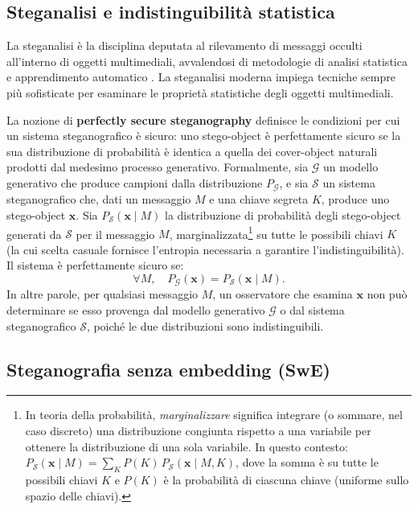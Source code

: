 \subsection{Steganalisi e indistinguibilità statistica}

La steganalisi è la disciplina deputata al rilevamento di messaggi occulti all'interno di oggetti multimediali, avvalendosi di metodologie di analisi statistica e apprendimento automatico \cite{apau-2024}. La steganalisi moderna impiega tecniche sempre più sofisticate per esaminare le proprietà statistiche degli oggetti multimediali.

La nozione di \textbf{perfectly secure steganography} \cite{kaptchuk-2021} definisce le condizioni per cui un sistema steganografico è sicuro: uno stego-object è perfettamente sicuro se la sua distribuzione di probabilità è identica a quella dei cover-object naturali prodotti dal medesimo processo generativo. Formalmente, sia $\mathcal{G}$ un modello generativo che produce campioni dalla distribuzione $P_\mathcal{G}$, e sia $\mathcal{S}$ un sistema steganografico che, dati un messaggio $M$ e una chiave segreta $K$, produce uno stego-object $\mathbf{x}$. Sia $P_\mathcal{S}(\mathbf{x} \mid M)$ la distribuzione di probabilità degli stego-object generati da $\mathcal{S}$ per il messaggio $M$, marginalizzata\footnote{In teoria della probabilità, \emph{marginalizzare} significa integrare (o sommare, nel caso discreto) una distribuzione congiunta rispetto a una variabile per ottenere la distribuzione di una sola variabile. In questo contesto: $P_{\mathcal{S}}(\mathbf{x} \mid M) = \sum_{K} P(K) \, P_{\mathcal{S}}(\mathbf{x} \mid M, K)$, dove la somma è su tutte le possibili chiavi $K$ e $P(K)$ è la probabilità di ciascuna chiave (uniforme sullo spazio delle chiavi).} su tutte le possibili chiavi $K$ (la cui scelta casuale fornisce l'entropia necessaria a garantire l'indistinguibilità). Il sistema è perfettamente sicuro se:
\[
\forall M,\quad P_\mathcal{G}(\mathbf{x}) = P_\mathcal{S}(\mathbf{x} \mid M).
\]
In altre parole, per qualsiasi messaggio $M$, un osservatore che esamina $\mathbf{x}$ non può determinare se esso provenga dal modello generativo $\mathcal{G}$ o dal sistema steganografico $\mathcal{S}$, poiché le due distribuzioni sono indistinguibili.

\subsection{Steganografia senza embedding (SwE)}

